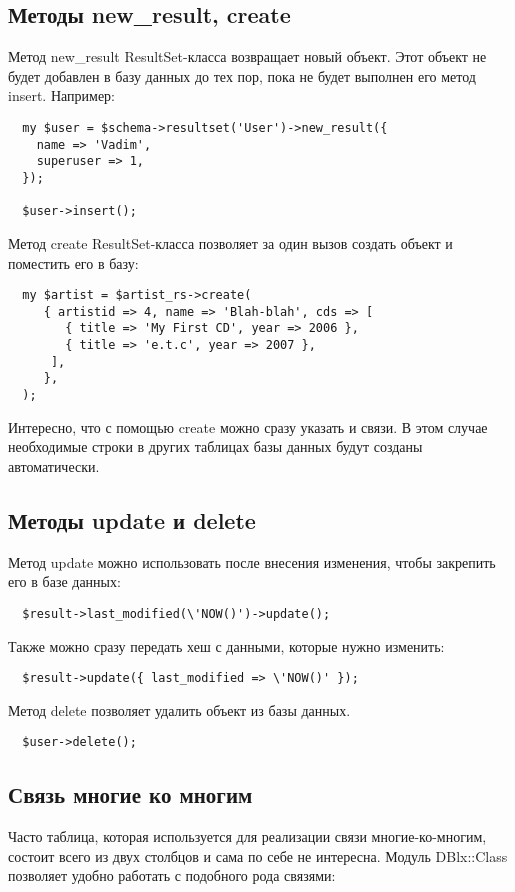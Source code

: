 \subsection{Методы new\_result, create}
Метод new\_result ResultSet-класса возвращает новый объект. Этот объект не будет добавлен в базу данных до тех пор, пока не будет выполнен его метод insert. Например:
\begin{verbatim}
  my $user = $schema->resultset('User')->new_result({
    name => 'Vadim',
    superuser => 1,
  });

  $user->insert();
\end{verbatim}
Метод create ResultSet-класса позволяет за один вызов создать объект и поместить его в базу:
\begin{verbatim}
  my $artist = $artist_rs->create(
     { artistid => 4, name => 'Blah-blah', cds => [
        { title => 'My First CD', year => 2006 },
        { title => 'e.t.c', year => 2007 },
      ],
     },
  );
\end{verbatim}
Интересно, что с помощью create можно сразу указать и связи. В этом случае необходимые строки в других таблицах базы данных будут созданы автоматически.

\subsection{Методы update и  delete}
Метод update можно использовать после внесения изменения, чтобы закрепить его в базе данных:
\begin{verbatim}
  $result->last_modified(\'NOW()')->update();
\end{verbatim}
Также можно сразу передать хеш с данными, которые нужно изменить:
\begin{verbatim}
  $result->update({ last_modified => \'NOW()' });
\end{verbatim}
Метод delete позволяет удалить объект из базы данных.
\begin{verbatim}
  $user->delete();
\end{verbatim}

\subsection{Связь многие ко многим}

Часто таблица, которая используется для реализации связи многие-ко-многим, состоит всего из двух столбцов и сама по себе не интересна. Модуль DBlx::Class позволяет удобно работать с подобного рода связями:
\begin{verbatim}
\end{verbatim}

